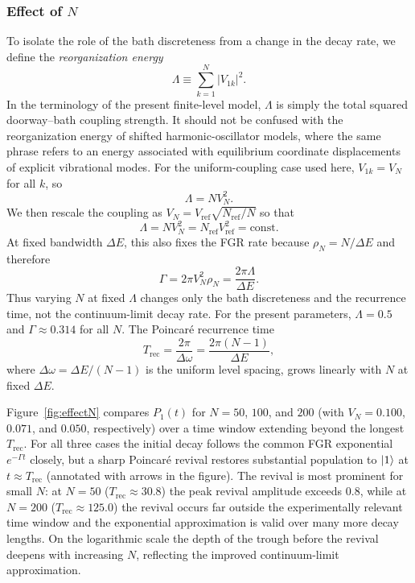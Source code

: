 \documentclass[aps,prx,reprint,showpacs,showkeys,floatfix]{revtex4-2}
\begin{document}
\subsubsection{Effect of $N$}

To isolate the role of the bath discreteness from a change in the decay
rate, we define the \emph{reorganization energy}
\begin{equation}
    \Lambda \equiv \sum_{k=1}^{N}|V_{1k}|^2.
    \label{eq:hybridization}
\end{equation}
In the terminology of the present finite-level model, $\Lambda$ is simply
the total squared doorway--bath coupling strength.  It should not be
confused with the reorganization energy of shifted harmonic-oscillator
models, where the same phrase refers to an energy associated with equilibrium
coordinate displacements of explicit vibrational modes.
For the uniform-coupling case used here, $V_{1k}=V_N$ for all $k$, so
\begin{equation}
    \Lambda = N V_N^2.
    \label{eq:hybridization_uniform}
\end{equation}
We then rescale the coupling as
$V_N = V_{\mathrm{ref}}\sqrt{N_{\mathrm{ref}}/N}$ so that
\begin{equation}
    \Lambda = N V_N^2 = N_{\mathrm{ref}}V_{\mathrm{ref}}^2 = \mathrm{const}.
    \label{eq:hybridization_fixed}
\end{equation}
At fixed bandwidth $\Delta E$, this also fixes the FGR rate because
$\rho_N=N/\Delta E$ and therefore
\begin{equation}
    \Gamma = 2\pi V_N^2\rho_N = \frac{2\pi \Lambda}{\Delta E}.
    \label{eq:Gamma_hybridization}
\end{equation}
Thus varying $N$ at fixed $\Lambda$ changes only the bath discreteness and
the recurrence time, not the continuum-limit decay rate.  For the present
parameters, $\Lambda = 0.5$ and $\Gamma\approx 0.314$ for all $N$.
The Poincar\'e recurrence time
\begin{equation}
    T_{\mathrm{rec}} = \frac{2\pi}{\Delta\omega} = \frac{2\pi(N-1)}{\Delta E},
    \label{eq:Trec}
\end{equation}
where $\Delta\omega = \Delta E/(N-1)$ is the uniform level spacing, grows
linearly with $N$ at fixed $\Delta E$.

Figure~\ref{fig:effectN} compares $P_1(t)$ for $N=50$, $100$, and $200$
(with $V_N = 0.100$, $0.071$, and $0.050$, respectively) over a time window
extending beyond the longest $T_{\mathrm{rec}}$.
For all three cases the initial decay follows the common FGR exponential
$e^{-\Gamma t}$ closely, but a sharp Poincar\'e revival restores
substantial population to $\ket{1}$ at $t\approx T_{\mathrm{rec}}$
(annotated with arrows in the figure).
The revival is most prominent for small $N$: at $N=50$
($T_{\mathrm{rec}}\approx 30.8$) the peak revival amplitude exceeds $0.8$,
while at $N=200$ ($T_{\mathrm{rec}}\approx 125.0$) the revival occurs
far outside the experimentally relevant time window and the exponential
approximation is valid over many more decay lengths.
On the logarithmic scale the depth of the trough before the revival
deepens with increasing $N$, reflecting the improved continuum-limit
approximation.
\end{document}
